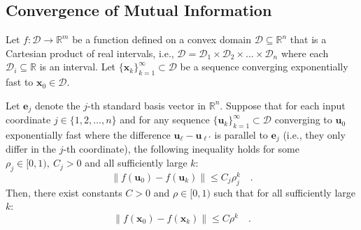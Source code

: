 \documentclass[../../main.tex]{subfiles}
\begin{document}
\pagebreak
\subsection{Convergence of Mutual Information}
\begin{theorem}
Let $f: \mathcal{D} \to \mathbb{R}^m$ be a function defined on a convex domain $\mathcal{D} \subseteq \mathbb{R}^n$ that is a Cartesian product of real intervals, i.e., $\mathcal{D} = \mathcal{D}_1 \times \mathcal{D}_2 \times \dots \times \mathcal{D}_n$ where each $\mathcal{D}_i \subseteq \mathbb{R}$ is an interval. Let $\{\bm{x}_k\}_{k=1}^\infty \subset \mathcal{D}$ be a sequence converging exponentially fast to $\bm{x}_0 \in \mathcal{D}$.

Let $\bm{e}_j$ denote the $j$-th standard basis vector in $\mathbb{R}^n$. Suppose that for each input coordinate $j \in \{1, 2, \dots, n\}$ and for any sequence $\{\bm{u}_k\}_{k=1}^\infty \subset \mathcal{D}$ converging to $\bm{u}_0$ exponentially fast where the difference $\bm{u}_\ell-\bm{u}_{\ell'}$ is parallel to $\bm{e}_j$ (i.e., they only differ in the $j$-th coordinate), the following inequality holds for some $\rho_j \in [0, 1), \ C_j > 0$ and all sufficiently large $k$:
\[
    \|f(\bm{u}_0) - f(\bm{u}_k)\| \le C_j \rho_j^k \quad .
\]
Then, there exist constants $C > 0$ and $\rho \in [0, 1)$ such that for all sufficiently large $k$:
\[
    \|f(\bm{x}_0) - f(\bm{x}_k)\| \le C \rho^k \quad .
\]
\end{theorem}
\end{document}
